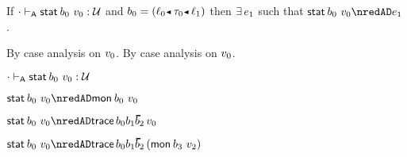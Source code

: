 \begin{lemma}\label{A-sta-type-progress}
  If\/ ${\cdot} \vdash_{\mathsf{A}} \mathsf{stat}^{}\,b_0~v_0 : {\mathcal U}$
  and\/ $\sbnd_0 \eeq \obnd{\sowner_0}{\stype_0}{\sowner_1}$
  then\/ $\exists\,e_1$
  such that\/ $\estab{\sbnd_0}{\svalue_0} \nredAD \sexpr_1$.
\end{lemma}{
  \newcommand{\shortproof}{By case analysis on $\svalue_0$.}
\begin{lamportproof*}
  \shortproof
\mainproof
  \shortproof

    \begin{pfproof}
      \absurdstep
        \begin{pfproof}
          ${\cdot} \vdash_{\mathsf{A}} \mathsf{stat}^{}\,b_0~v_0 : {\mathcal U}$
        \end{pfproof}
    \end{pfproof}

    \begin{pfproof}
      \qedstep
        \begin{pfproof}
          $\estab{\sbnd_0}{\svalue_0} \nredAD \emon{\sbnd_0}{\svalue_0}$
        \end{pfproof}
    \end{pfproof}

    \begin{pfproof}
        \begin{pfproof}
          \qedstep
            \begin{pfproof}
              $\estab{\sbnd_0}{\svalue_0} \nredAD \eprehist{\fconcat{\sbnd_0}{\fconcat{\sbnd_1}{\sblist_2}}}{\svalue_0}$
            \end{pfproof}
        \end{pfproof}
        \begin{pfproof}
          $\estab{\sbnd_0}{\svalue_0} \nredAD \eprehist{\fconcat{\sbnd_0}{\fconcat{\sbnd_1}{\sblist_2}}}{(\emon{\sbnd_3}{\svalue_2})}$
        \end{pfproof}
    \end{pfproof}


\end{lamportproof*}}
